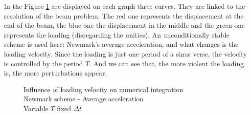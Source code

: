 \documentclass[12pt,a4paper]{article}
\begin{document}
In the Figure \ref{InfluenceLoadingVelocityOnIntegration} are displayed on each graph three curves. They are linked to the resolution of the beam problem. The red one represents the displacement at the end of the beam, the blue one the displacement in the middle and the green one represents the loading (disregarding the unities). An unconditionally stable scheme is used here: Newmark's average acceleration, and what changes is the loading velocity. Since the loading is just one period of a sinus verse, the velocity is controlled by the period $T$. And we can see that, the more violent the loading is, the more perturbations appear.
\begin{figure}[!ht]
\centering
{}
\hspace{0.5cm}
\hspace{0.5cm}
\caption{Influence of loading velocity on numerical integration 
\\ Newmark scheme - Average acceleration 
\\ Variable $T$ fixed $\Delta t$
\label{InfluenceLoadingVelocityOnIntegration}}
\end{figure}
\end{document}
